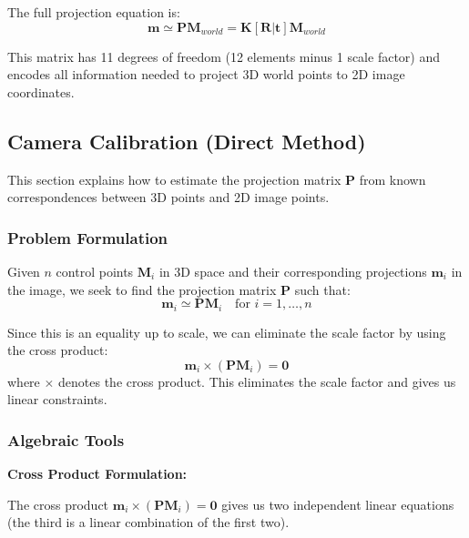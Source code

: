 \documentclass[11pt,a4paper]{article}
\theoremstyle{definition}
\theoremstyle{plain}
\theoremstyle{remark}
\begin{document}
The full projection equation is:
\begin{equation} \label{eq:full_projection}
    \mathbf{m} \simeq \mathbf{P} \mathbf{M}_{world} = \mathbf{K} [\mathbf{R} | \mathbf{t}] \mathbf{M}_{world}
\end{equation}

This matrix has 11 degrees of freedom (12 elements minus 1 scale factor) and encodes all information needed to project 3D world points to 2D image coordinates.

\subsection{Camera Calibration (Direct Method)}

This section explains how to estimate the projection matrix $\mathbf{P}$ from known correspondences between 3D points and 2D image points.

\subsubsection{Problem Formulation}

Given $n$ control points $\mathbf{M}_i$ in 3D space and their corresponding projections $\mathbf{m}_i$ in the image, we seek to find the projection matrix $\mathbf{P}$ such that:
\begin{equation} \label{eq:calibration_projection}
    \mathbf{m}_i \simeq \mathbf{P} \mathbf{M}_i \quad \text{for } i = 1, \ldots, n
\end{equation}

Since this is an equality up to scale, we can eliminate the scale factor by using the cross product:
\begin{equation} \label{eq:calibration_cross_product}
    \mathbf{m}_i \times (\mathbf{P} \mathbf{M}_i) = \mathbf{0}
\end{equation}
where $\times$ denotes the cross product. This eliminates the scale factor and gives us linear constraints.

\subsubsection{Algebraic Tools}

\textbf{Cross Product Formulation:}

The cross product $\mathbf{m}_i \times (\mathbf{P} \mathbf{M}_i) = \mathbf{0}$ gives us two independent linear equations (the third is a linear combination of the first two).
\end{document}
